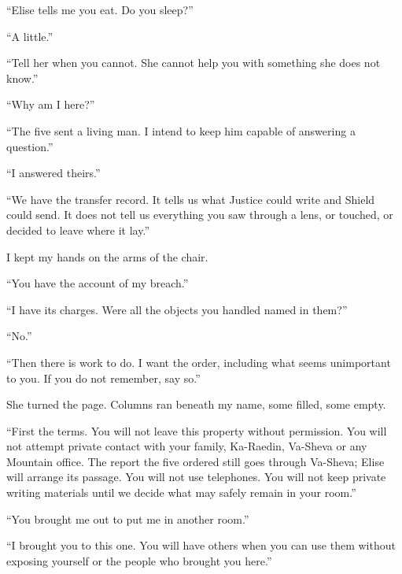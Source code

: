 ``Elise tells me you eat. Do you sleep?''\par

``A little.''\par

``Tell her when you cannot. She cannot help you with something she does not know.''\par

``Why am I here?''\par

``The five sent a living man. I intend to keep him capable of answering a question.''\par

``I answered theirs.''\par

``We have the transfer record. It tells us what Justice could write and Shield could send. It does not tell us everything you saw through a lens, or touched, or decided to leave where it lay.''\par

I kept my hands on the arms of the chair.\par

``You have the account of my breach.''\par

``I have its charges. Were all the objects you handled named in them?''\par

``No.''\par

``Then there is work to do. I want the order, including what seems unimportant to you. If you do not remember, say so.''\par

She turned the page. Columns ran beneath my name, some filled, some empty.\par

``First the terms. You will not leave this property without permission. You will not attempt private contact with your family, Ka-Raedin, Va-Sheva or any Mountain office. The report the five ordered still goes through Va-Sheva; Elise will arrange its passage. You will not use telephones. You will not keep private writing materials until we decide what may safely remain in your room.''\par

``You brought me out to put me in another room.''\par

``I brought you to this one. You will have others when you can use them without exposing yourself or the people who brought you here.''\par

